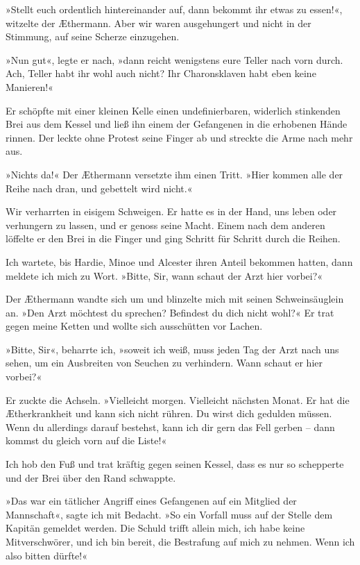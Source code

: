 »Stellt euch ordentlich hintereinander auf, dann bekommt ihr etwas
zu essen!«, witzelte der Æthermann. Aber wir waren ausgehungert und
nicht in der Stimmung, auf seine Scherze einzugehen.

»Nun gut«, legte er nach, »dann reicht wenigstens eure Teller nach
vorn durch. Ach, Teller habt ihr wohl auch nicht? Ihr Charonsklaven
habt eben keine Manieren!«

Er schöpfte mit einer kleinen Kelle einen undefinierbaren,
widerlich stinkenden Brei aus dem Kessel und ließ ihn einem der
Gefangenen in die erhobenen Hände rinnen. Der leckte ohne Protest
seine Finger ab und streckte die Arme nach mehr aus.

»Nichts da!« Der Æthermann versetzte ihm einen Tritt. »Hier kommen
alle der Reihe nach dran, und gebettelt wird nicht.«

Wir verharrten in eisigem Schweigen. Er hatte es in der Hand, uns
leben oder verhungern zu lassen, und er genoss seine Macht. Einem
nach dem anderen löffelte er den Brei in die Finger und ging
Schritt für Schritt durch die Reihen.

Ich wartete, bis Hardie, Minoe und Alcester ihren Anteil bekommen
hatten, dann meldete ich mich zu Wort. »Bitte, Sir, wann schaut der
Arzt hier vorbei?«

Der Æthermann wandte sich um und blinzelte mich mit seinen
Schweinsäuglein an. »Den Arzt möchtest du sprechen? Befindest du
dich nicht wohl?« Er trat gegen meine Ketten und wollte sich
ausschütten vor Lachen.

»Bitte, Sir«, beharrte ich, »soweit ich weiß, muss jeden Tag der
Arzt nach uns sehen, um ein Ausbreiten von Seuchen zu verhindern.
Wann schaut er hier vorbei?«

Er zuckte die Achseln. »Vielleicht morgen. Vielleicht nächsten
Monat. Er hat die Ætherkrankheit und kann sich nicht rühren. Du
wirst dich gedulden müssen. Wenn du allerdings darauf bestehst,
kann ich dir gern das Fell gerben – dann kommst du gleich vorn auf
die Liste!«

Ich hob den Fuß und trat kräftig gegen seinen Kessel, dass es nur
so schepperte und der Brei über den Rand schwappte.

»Das war ein tätlicher Angriff eines Gefangenen auf ein Mitglied
der Mannschaft«, sagte ich mit Bedacht. »So ein Vorfall muss auf
der Stelle dem Kapitän gemeldet werden. Die Schuld trifft allein
mich, ich habe keine Mitverschwörer, und ich bin bereit, die
Bestrafung auf mich zu nehmen. Wenn ich also bitten dürfte!«

